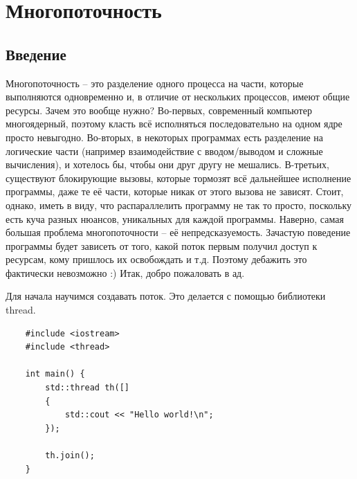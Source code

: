 \documentclass[12pt, a4paper]{article}
\begin{document}
\section{Многопоточность}
\subsection{Введение}
Многопоточность -- это разделение одного процесса на части, которые выполняются одновременно и, в отличие от нескольких процессов, имеют общие ресурсы. Зачем это вообще нужно? Во-первых, современный компьютер многоядерный, поэтому класть всё исполняться последовательно на одном ядре просто невыгодно. Во-вторых, в некоторых программах есть разделение на логические части (например взаимодействие с вводом/выводом и сложные вычисления), и хотелось бы, чтобы они друг другу не мешались. В-третьих, существуют блокирующие вызовы, которые тормозят всё дальнейшее исполнение программы, даже те её части, которые никак от этого вызова не зависят. Стоит, однако, иметь в виду, что распараллелить программу не так то просто, поскольку есть куча разных нюансов, уникальных для каждой программы. 
Наверно, самая большая проблема многопоточности -- её непредсказуемость. Зачастую поведение программы будет зависеть от того, какой поток первым получил доступ к ресурсам, кому пришлось их освобождать и т.д. Поэтому дебажить это фактически невозможно :) Итак, добро пожаловать в ад.
\par Для начала научимся создавать поток. Это делается с помощью библиотеки thread.
\begin{verbatim}
	#include <iostream>
	#include <thread>
	
	int main() {
		std::thread th([]
		{
			std::cout << "Hello world!\n";
		});
		
		th.join();
	}
\end{verbatim}
\end{document}
